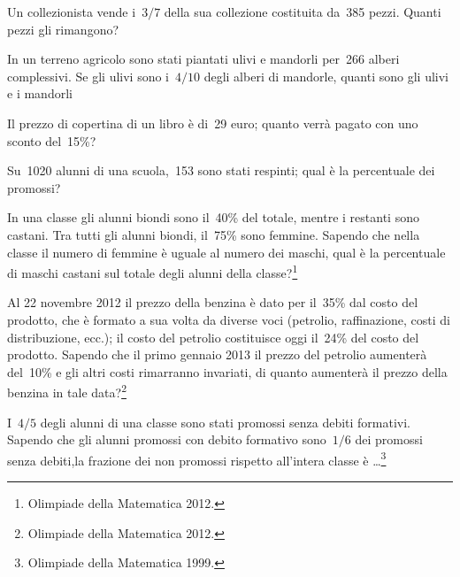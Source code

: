 \begin{multicols}{2}
\begin{esercizio}[\Ast]%
 Un collezionista vende i~$3/7$ della sua collezione costituita da~385
pezzi. Quanti pezzi gli rimangono?
\end{esercizio}

\begin{esercizio}[\Ast]%
 In un terreno agricolo sono stati piantati ulivi e mandorli per~266
alberi complessivi. Se gli ulivi sono i~$4/10$ degli alberi di mandorle,
quanti sono gli ulivi e i mandorli
\end{esercizio}

\begin{esercizio}[\Ast]%
Il prezzo di copertina di un libro è di~29 euro; quanto verrà
pagato con uno sconto del~15\%?
\end{esercizio}

\begin{esercizio}[\Ast]%
Su~1020 alunni di una scuola,~153 sono stati respinti; qual è la
percentuale dei promossi?
\end{esercizio}

\begin{esercizio}[\Ast]%
In una classe gli alunni biondi sono il~40\% del totale, mentre i restanti sono castani. Tra tutti gli alunni biondi, il~75\% sono femmine. Sapendo che nella classe il numero di femmine è uguale al numero dei maschi, qual è la percentuale di maschi castani sul totale degli alunni della classe?\footnote{Olimpiade della Matematica 2012.}
\end{esercizio}

\begin{esercizio}[\Ast]%
Al 22 novembre 2012 il prezzo della benzina è dato per il~35\% dal costo del prodotto, che è formato a sua volta da diverse voci (petrolio, raffinazione, costi di distribuzione, ecc.); il costo del petrolio costituisce oggi il~24\% del costo del prodotto. Sapendo che il primo gennaio 2013 il prezzo del petrolio aumenterà del~10\% e gli altri costi rimarranno invariati, di quanto aumenterà il prezzo della benzina in tale data?\footnote{Olimpiade della Matematica 2012.}
\end{esercizio}

\begin{esercizio}[\Ast]%
I~$4/5$ degli alunni di una classe sono stati promossi senza debiti formativi. Sapendo che gli alunni promossi con debito formativo sono~$1/6$ dei promossi senza debiti,la frazione dei non promossi rispetto all'intera classe è \ldots \footnote{Olimpiade della Matematica 1999.}
\end{esercizio}


\end{multicols}
